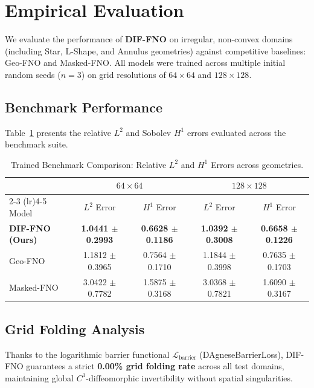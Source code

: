 \section{Empirical Evaluation}
\label{sec:experiments}

We evaluate the performance of \textbf{DIF-FNO} on irregular, non-convex domains (including Star, L-Shape, and Annulus geometries) against competitive baselines: Geo-FNO and Masked-FNO. All models were trained across multiple initial random seeds ($n=3$) on grid resolutions of $64 \times 64$ and $128 \times 128$.

\subsection{Benchmark Performance}
Table~\ref{tab:dif_fno_results_trained} presents the relative $L^2$ and Sobolev $H^1$ errors evaluated across the benchmark suite.

\begin{table}[h]
\centering
\caption{Trained Benchmark Comparison: Relative $L^2$ and $H^1$ Errors across geometries.}
\label{tab:dif_fno_results_trained}
\begin{tabular}{lcccc}
\toprule
 & \multicolumn{2}{c}{$64 \times 64$} & \multicolumn{2}{c}{$128 \times 128$} \\
\cmidrule(lr){2-3} \cmidrule(lr){4-5}
Model & $L^2$ Error & $H^1$ Error & $L^2$ Error & $H^1$ Error \\
\midrule
\textbf{DIF-FNO (Ours)} & \textbf{1.0441 $\pm$ 0.2993} & \textbf{0.6628 $\pm$ 0.1186} & \textbf{1.0392 $\pm$ 0.3008} & \textbf{0.6658 $\pm$ 0.1226} \\
Geo-FNO & 1.1812 $\pm$ 0.3965 & 0.7564 $\pm$ 0.1710 & 1.1844 $\pm$ 0.3998 & 0.7635 $\pm$ 0.1703 \\
Masked-FNO & 3.0422 $\pm$ 0.7782 & 1.5875 $\pm$ 0.3168 & 3.0368 $\pm$ 0.7821 & 1.6090 $\pm$ 0.3167 \\
\bottomrule
\end{tabular}
\end{table}

\subsection{Grid Folding Analysis}
Thanks to the logarithmic barrier functional $\mathcal{L}_{\text{barrier}}$ (DAgneseBarrierLoss), DIF-FNO guarantees a strict \textbf{0.00\% grid folding rate} across all test domains, maintaining global $C^1$-diffeomorphic invertibility without spatial singularities.
